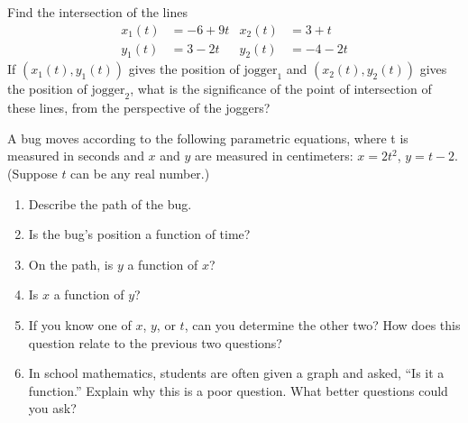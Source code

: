 \begin{prob}
Find the intersection of the lines
\begin{align*}
x_1(t) &= -6 + 9t & x_2(t) &= 3+t \\
y_1(t) &= 3-2t &  y_2(t) &= -4-2t 
\end{align*}
If $(x_1(t),y_1(t))$ gives the position of $\mathrm{jogger}_1$ and
$(x_2(t),y_2(t))$ gives the position of $\mathrm{jogger}_2$, what is
the significance of the point of intersection of these lines, from the
perspective of the joggers?
\end{prob}

\begin{prob}
A bug moves according to the following parametric equations, where t is measured in seconds and $x$ and $y$ are measured in centimeters:  $x = 2t^2$, $y = t-2$.  (Suppose $t$ can be any real number.)   
\begin{enumerate}
\item Describe the path of the bug.  
\item Is the bug's position a function of time?  
\item On the path, is $y$ a function of $x$?  
\item Is $x$ a function of $y$?  
\item If you know one of $x$, $y$, or $t$, can you determine the other two?  How does this question relate to the previous two questions?  
\item In school mathematics, students are often given a graph and asked, ``Is it a function.''  Explain why this is a poor question.  What better questions could you ask?  
\end{enumerate}
\end{prob}

